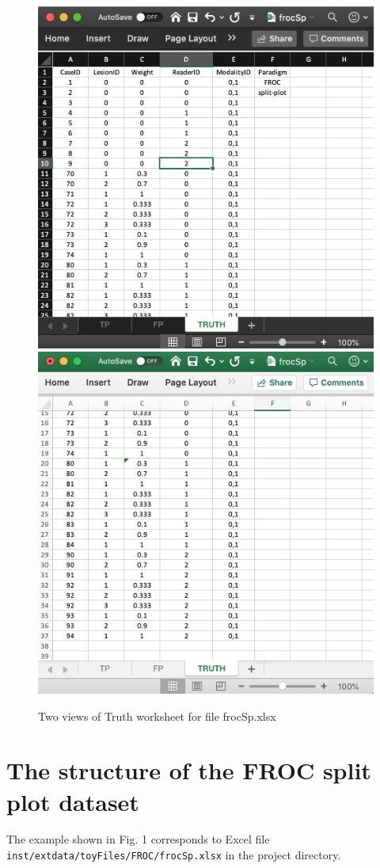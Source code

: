 \documentclass[
]{book}
\begin{document}
\begin{figure}

{\centering \includegraphics[width=0.5\linewidth,height=0.2\textheight]{images/frocSpTruth} \includegraphics[width=0.5\linewidth,height=0.2\textheight]{images/frocSpTruth2} 

}

\caption{Two views of Truth worksheet for file frocSp.xlsx}\label{fig:frocSpTruth2}
\end{figure}

\hypertarget{the-structure-of-the-froc-split-plot-dataset}{%
\section{The structure of the FROC split plot dataset}\label{the-structure-of-the-froc-split-plot-dataset}}

The example shown in Fig. 1 corresponds to Excel file \texttt{inst/extdata/toyFiles/FROC/frocSp.xlsx} in the project directory.
\end{document}

